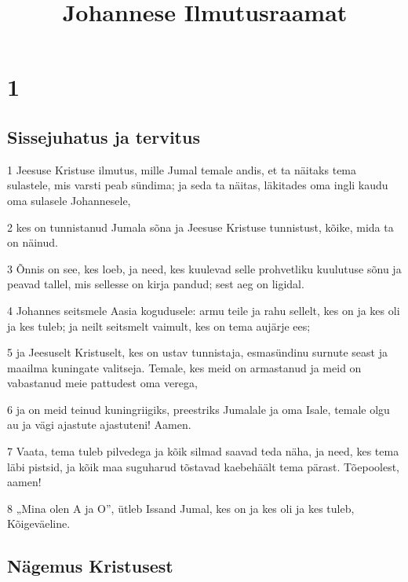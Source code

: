 

\title{Johannese Ilmutusraamat}

\chapter{1}

\section*{Sissejuhatus ja tervitus}

\par 1 Jeesuse Kristuse ilmutus, mille Jumal temale andis, et ta näitaks tema sulastele, mis varsti peab sündima; ja seda ta näitas, läkitades oma ingli kaudu oma sulasele Johannesele,
\par 2 kes on tunnistanud Jumala sõna ja Jeesuse Kristuse tunnistust, kõike, mida ta on näinud.
\par 3 Õnnis on see, kes loeb, ja need, kes kuulevad selle prohvetliku kuulutuse sõnu ja peavad tallel, mis sellesse on kirja pandud; sest aeg on ligidal.
\par 4 Johannes seitsmele Aasia kogudusele: armu teile ja rahu sellelt, kes on ja kes oli ja kes tuleb; ja neilt seitsmelt vaimult, kes on tema aujärje ees;
\par 5 ja Jeesuselt Kristuselt, kes on ustav tunnistaja, esmasündinu surnute seast ja maailma kuningate valitseja. Temale, kes meid on armastanud ja meid on vabastanud meie pattudest oma verega,
\par 6 ja on meid teinud kuningriigiks, preestriks Jumalale ja oma Isale, temale olgu au ja vägi ajastute ajastuteni! Aamen.
\par 7 Vaata, tema tuleb pilvedega ja kõik silmad saavad teda näha, ja need, kes tema läbi pistsid, ja kõik maa suguharud tõstavad kaebehäält tema pärast. Tõepoolest, aamen!
\par 8 „Mina olen A ja O”, ütleb Issand Jumal, kes on ja kes oli ja kes tuleb, Kõigeväeline.

\section*{Nägemus Kristusest}

